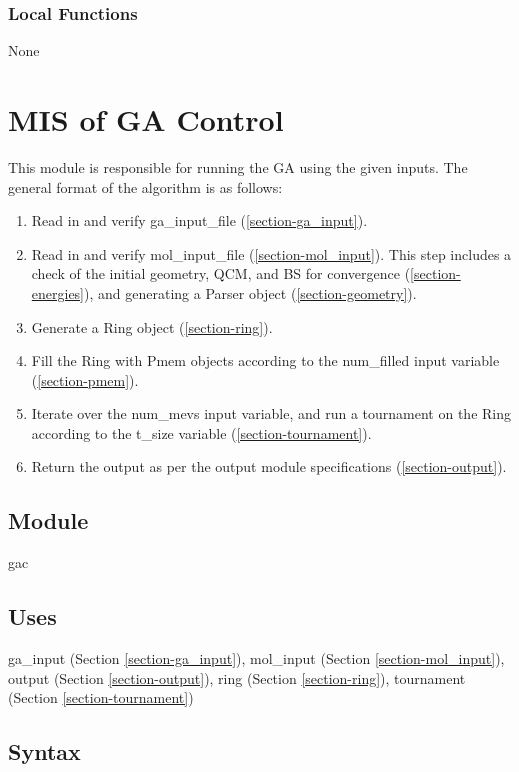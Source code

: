 \documentclass[12pt, titlepage]{article}
\begin{document}
\subsubsection{Local Functions}

None

\section{MIS of GA Control} \label{section-gac} 

This module is responsible for running the GA using the given inputs. The 
general format of the algorithm is as follows:
\begin{enumerate}
	\item Read in and verify ga\_input\_file (\ref{section-ga_input}).
	\item Read in and verify mol\_input\_file (\ref{section-mol_input}). This 
	step includes a check of the initial geometry, QCM, and BS for convergence 
	(\ref{section-energies}), and generating a Parser object 
	(\ref{section-geometry}).
	\item Generate a Ring object (\ref{section-ring}).
	\item Fill the Ring with Pmem objects according to the num\_filled input 
	variable (\ref{section-pmem}).
	\item Iterate over the num\_mevs input variable, and run a tournament on 
	the Ring according to the t\_size variable (\ref{section-tournament}).
	\item Return the output as per the output module specifications 
	(\ref{section-output}).
\end{enumerate}

\subsection{Module}

gac

\subsection{Uses}

ga\_input (Section \ref{section-ga_input}), 
mol\_input (Section \ref{section-mol_input}),
output (Section \ref{section-output}),
ring (Section \ref{section-ring}),
tournament (Section \ref{section-tournament})

\subsection{Syntax}
\end{document}

